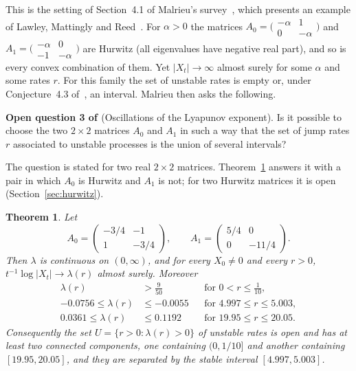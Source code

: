 \documentclass[11pt]{amsart}
\newtheorem{theorem}{Theorem}[section]
\begin{document}
This is the setting of Section~4.1 of Malrieu's survey~\cite{Mal15}, which presents an example of Lawley, Mattingly
and Reed~\cite{LMR14}. For $\alpha>0$ the matrices
$A_0=\bigl(\begin{smallmatrix}-\alpha&1\\0&-\alpha\end{smallmatrix}\bigr)$ and
$A_1=\bigl(\begin{smallmatrix}-\alpha&0\\-1&-\alpha\end{smallmatrix}\bigr)$ are Hurwitz (all eigenvalues have negative real part), and so is every convex combination of them. Yet
$|X_t|\to\infty$ almost surely for some $\alpha$ and some rates $r$. For this family the set of unstable rates is empty
or, under Conjecture~4.3 of~\cite{Mal15}, an interval. Malrieu then asks the following.

\medskip
\noindent\textbf{Open question 3 of \cite{Mal15}} (Oscillations of the Lyapunov exponent). Is it possible to choose the
two $2\times2$ matrices $A_0$ and $A_1$ in such a way that the set of jump rates $r$ associated to unstable processes is
the union of several intervals?
\medskip

The question is stated for two real $2\times2$ matrices. Theorem~\ref{thm:main} answers it with a pair in which $A_0$
is Hurwitz and $A_1$ is not; for two Hurwitz matrices it is open (Section~\ref{sec:hurwitz}).

\begin{theorem}\label{thm:main}
Let
\begin{equation}\label{eq:pair}
A_0=\begin{pmatrix}-3/4&-1\\1&-3/4\end{pmatrix},\qquad A_1=\begin{pmatrix}5/4&0\\0&-11/4\end{pmatrix}.
\end{equation}
Then $\lambda$ is continuous on $(0,\infty)$, and for every $X_0\ne0$ and every $r>0$,
$t^{-1}\log|X_t|\to\lambda(r)$ almost surely. Moreover
\begin{align*}
\lambda(r)&>\tfrac{9}{50} && \text{for } 0<r\le\tfrac1{10},\\
-0.0756\le\lambda(r)&\le-0.0055 && \text{for } 4.997\le r\le5.003,\\
0.0361\le\lambda(r)&\le0.1192 && \text{for } 19.95\le r\le20.05.
\end{align*}
Consequently the set $U=\{r>0:\lambda(r)>0\}$ of unstable rates is open and has at least two connected components,
one containing $(0,1/10]$ and another containing $[19.95,20.05]$, and they are separated by the stable interval
$[4.997,5.003]$.
\end{theorem}
\end{document}
